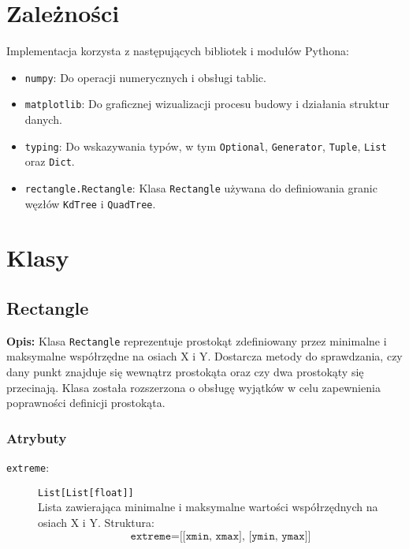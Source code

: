 \documentclass[12pt]{article}
\begin{document}
\section{Zależności}

Implementacja korzysta z następujących bibliotek i modułów Pythona:

\begin{itemize}
    \item \texttt{numpy}: Do operacji numerycznych i obsługi tablic.
    \item \texttt{matplotlib}: Do graficznej wizualizacji procesu budowy i działania struktur danych.
    \item \texttt{typing}: Do wskazywania typów, w tym \texttt{Optional}, \texttt{Generator}, \texttt{Tuple}, \texttt{List} oraz \texttt{Dict}.
    \item \texttt{rectangle.Rectangle}: Klasa \texttt{Rectangle} używana do definiowania granic węzłów \texttt{KdTree} i \texttt{QuadTree}.
\end{itemize}

\section{Klasy}

\subsection{Rectangle}

\textbf{Opis:} Klasa \texttt{Rectangle} reprezentuje prostokąt zdefiniowany przez minimalne i maksymalne współrzędne na osiach X i Y. Dostarcza metody do sprawdzania, czy dany punkt znajduje się wewnątrz prostokąta oraz czy dwa prostokąty się przecinają. Klasa została rozszerzona o obsługę wyjątków w celu zapewnienia poprawności definicji prostokąta.

\subsubsection{Atrybuty}

\begin{description}
    \item[\texttt{extreme}:] \texttt{List[List[float]]} \\
    Lista zawierająca minimalne i maksymalne wartości współrzędnych na osiach X i Y. Struktura:
    \[
    \texttt{extreme} =  \texttt{[[xmin, xmax], [ymin, ymax]]}
    \]
\end{description}
\end{document}
